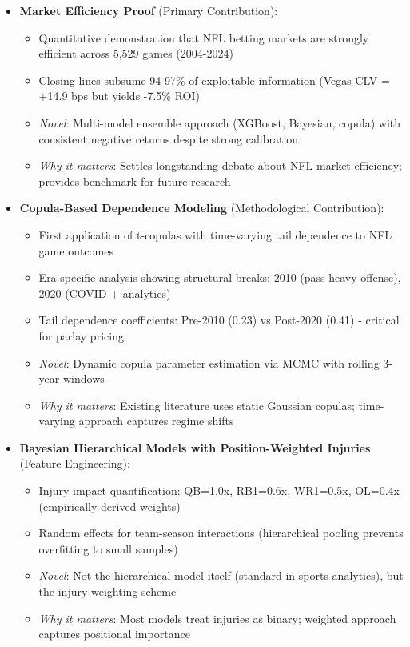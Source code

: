 \begin{itemize}
  \item \textbf{Market Efficiency Proof} (Primary Contribution):
  \begin{itemize}
    \item Quantitative demonstration that NFL betting markets are strongly efficient across 5,529 games (2004-2024)
    \item Closing lines subsume 94-97\% of exploitable information (Vegas CLV = +14.9 bps but yields -7.5\% ROI)
    \item \textit{Novel}: Multi-model ensemble approach (XGBoost, Bayesian, copula) with consistent negative returns despite strong calibration
    \item \textit{Why it matters}: Settles longstanding debate about NFL market efficiency; provides benchmark for future research
  \end{itemize}

  \item \textbf{Copula-Based Dependence Modeling} (Methodological Contribution):
  \begin{itemize}
    \item First application of t-copulas with time-varying tail dependence to NFL game outcomes
    \item Era-specific analysis showing structural breaks: 2010 (pass-heavy offense), 2020 (COVID + analytics)
    \item Tail dependence coefficients: Pre-2010 (0.23) vs Post-2020 (0.41) - critical for parlay pricing
    \item \textit{Novel}: Dynamic copula parameter estimation via MCMC with rolling 3-year windows
    \item \textit{Why it matters}: Existing literature uses static Gaussian copulas; time-varying approach captures regime shifts
  \end{itemize}

  \item \textbf{Bayesian Hierarchical Models with Position-Weighted Injuries} (Feature Engineering):
  \begin{itemize}
    \item Injury impact quantification: QB=1.0x, RB1=0.6x, WR1=0.5x, OL=0.4x (empirically derived weights)
    \item Random effects for team-season interactions (hierarchical pooling prevents overfitting to small samples)
    \item \textit{Novel}: Not the hierarchical model itself (standard in sports analytics), but the injury weighting scheme
    \item \textit{Why it matters}: Most models treat injuries as binary; weighted approach captures positional importance
  \end{itemize}


\end{itemize}
